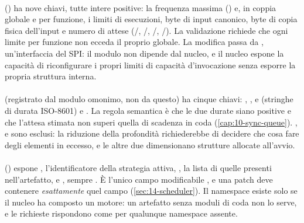 \paragraph{} () ha
nove chiavi, tutte intere positive: la frequenza massima
() e, in coppia globale e per funzione, i limiti di
esecuzioni, byte di input canonico, byte di copia fisica dell'input e numero di
attese (/,
/,
/,
/). La validazione richiede che ogni
limite per funzione non ecceda il proprio globale. La modifica passa da
, un'interfaccia del SPI: il modulo non dipende dal
nucleo, e il nucleo espone la capacit\`a di riconfigurare i propri limiti di
capacit\`a d'invocazione senza esporre la propria struttura interna.

\paragraph{} (registrato dal modulo omonimo, non da questo) ha
cinque chiavi: , ,  e
 (stringhe di durata ISO-8601) e . La
regola semantica \`e che le due durate siano positive e che l'attesa stimata non
superi quella di scadenza in coda (\cref{cap:10-sync-queue}). ,
 e  sono esclusi: la
riduzione della profondit\`a richiederebbe di decidere che cosa fare degli
elementi in eccesso, e le altre due dimensionano strutture allocate all'avvio.

\paragraph{} () espone
, l'identificatore della strategia attiva, , la
lista di quelle presenti nell'artefatto, e , sempre
. \`E l'unico campo modificabile , e una patch deve
contenere \emph{esattamente} quel campo (\cref{sec:14-scheduler}). Il namespace
esiste solo se il nucleo ha composto un motore: un artefatto senza moduli di coda
non lo serve, e le richieste rispondono  come per qualunque namespace
assente.

